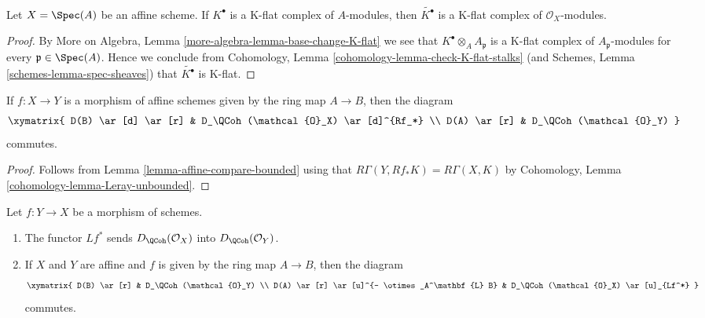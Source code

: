 \begin{lemma}
\label{lemma-affine-K-flat}
Let $X = \Spec(A)$ be an affine scheme. If $K^\bullet$ is a K-flat
complex of $A$-modules, then $\widetilde{K^\bullet}$ is a K-flat
complex of $\mathcal{O}_X$-modules.
\end{lemma}

\begin{proof}
By More on Algebra, Lemma \ref{more-algebra-lemma-base-change-K-flat}
we see that $K^\bullet \otimes_A A_\mathfrak p$ is a K-flat complex
of $A_\mathfrak p$-modules for every $\mathfrak p \in \Spec(A)$.
Hence we conclude from
Cohomology, Lemma \ref{cohomology-lemma-check-K-flat-stalks}
(and
Schemes, Lemma \ref{schemes-lemma-spec-sheaves})
that $\widetilde{K^\bullet}$ is K-flat.
\end{proof}

\begin{lemma}
\label{lemma-quasi-coherence-pushforward}
If $f : X \to Y$ is a morphism of affine schemes given by the ring map
$A \to B$, then the diagram
$$
\xymatrix{
D(B) \ar[d] \ar[r] & D_\QCoh(\mathcal{O}_X) \ar[d]^{Rf_*} \\
D(A) \ar[r] & D_\QCoh(\mathcal{O}_Y)
}
$$
commutes.
\end{lemma}

\begin{proof}
Follows from Lemma \ref{lemma-affine-compare-bounded}
using that $R\Gamma(Y, Rf_*K) = R\Gamma(X, K)$ by
Cohomology, Lemma \ref{cohomology-lemma-Leray-unbounded}.
\end{proof}

\begin{lemma}
\label{lemma-quasi-coherence-pullback}
Let $f : Y \to X$ be a morphism of schemes.
\begin{enumerate}
\item The functor $Lf^*$ sends $D_\QCoh(\mathcal{O}_X)$
into $D_\QCoh(\mathcal{O}_Y)$.
\item If $X$ and $Y$ are affine and $f$ is given by the ring map
$A \to B$, then the diagram
$$
\xymatrix{
D(B) \ar[r] & D_\QCoh(\mathcal{O}_Y) \\
D(A) \ar[r] \ar[u]^{- \otimes_A^\mathbf{L} B} &
D_\QCoh(\mathcal{O}_X) \ar[u]_{Lf^*}
}
$$
commutes.
\end{enumerate}
\end{lemma}

